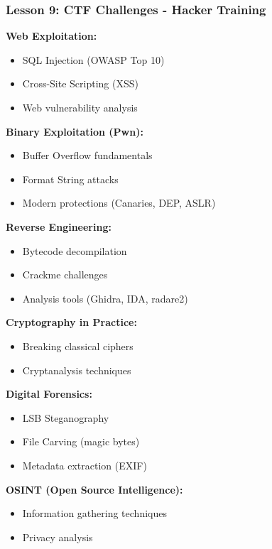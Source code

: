 \documentclass[11pt,letterpaper]{article}
\begin{document}
\subsubsection{Lesson 9: CTF Challenges - Hacker Training}
\textbf{Web Exploitation:}
\begin{itemize}[leftmargin=*]
    \item SQL Injection (OWASP Top 10)
    \item Cross-Site Scripting (XSS)
    \item Web vulnerability analysis
\end{itemize}

\textbf{Binary Exploitation (Pwn):}
\begin{itemize}[leftmargin=*]
    \item Buffer Overflow fundamentals
    \item Format String attacks
    \item Modern protections (Canaries, DEP, ASLR)
\end{itemize}

\textbf{Reverse Engineering:}
\begin{itemize}[leftmargin=*]
    \item Bytecode decompilation
    \item Crackme challenges
    \item Analysis tools (Ghidra, IDA, radare2)
\end{itemize}

\textbf{Cryptography in Practice:}
\begin{itemize}[leftmargin=*]
    \item Breaking classical ciphers
    \item Cryptanalysis techniques
\end{itemize}

\textbf{Digital Forensics:}
\begin{itemize}[leftmargin=*]
    \item LSB Steganography
    \item File Carving (magic bytes)
    \item Metadata extraction (EXIF)
\end{itemize}

\textbf{OSINT (Open Source Intelligence):}
\begin{itemize}[leftmargin=*]
    \item Information gathering techniques
    \item Privacy analysis
\end{itemize}
\end{document}
